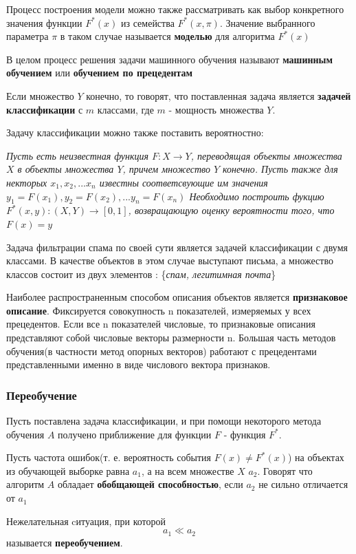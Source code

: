 Процесс построения модели можно также рассматривать как выбор конкретного значения функции $F^*(x)$ из семейства $F^*(x, \pi)$. Значение выбранного параметра $\pi$ в таком случае называется \textbf{моделью} для алгоритма
$F^*(x)$

В целом процесс решения задачи машинного обучения называют \textbf{машинным обучением} или \textbf{обучением по прецедентам}

Если множество $Y$ конечно, то говорят, что поставленная задача  является \textbf{задачей классификации} с $m$ классами, где $m$ - мощность множества $Y$.

Задачу классификации можно также поставить вероятностно:

\textit {
Пусть есть неизвестная функция $F: X \rightarrow Y$, переводящая объекты
множества $X$ в объекты множества $Y$, причем множество $Y$ конечно. Пусть также для некторых $x_1, x_2, ... x_n$ известны соответсвующие им значения $y_1 = F(x_1), y_2 = F(x_2), ... y_n = F(x_n)$ Необходимо построить фукцию $F^*(x, y): (X, Y) \rightarrow [0, 1]$, возвращающую оценку вероятности того, что $F(x)=y$
}

Задача фильтрации спама по своей сути является задачей классификации с двумя классами. В качестве объектов в этом случае выступают письма, а множество классов состоит из двух элементов : \{\textit{спам, легитимная почта}\}

Наиболее распространенным способом описания объектов является \textbf{признаковое описание}. Фиксируется совокупность n показателей, измеряемых у всех прецедентов. Если все n показателей числовые, то признаковые описания представляют собой числовые векторы размерности n. Большая часть методов обучения(в частности метод опорных векторов) работают с прецедентами представленными именно в виде числового вектора признаков.


\subsubsection{Переобучение}
\label{overfitting}
Пусть поставлена задача классификации, и при помощи некоторого метода обучения $A$ получено приближение для функции $F$ - функция $F^*$. 

Пусть частота ошибок(т. е. вероятность события $F(x) \neq F^*(x)$) на объектах из обучающей выборке равна $a_1$, а на всем множестве $X$ $a_2$. Говорят что алгоритм $A$ обладает \textbf{обобщающей способностью}, если $a_2$ не сильно отличается от $a_1$

Нежелательная cитуация, при которой 
\begin{equation}
	a_1 \ll a_2
\end{equation} называется \textbf{переобучением}. 

